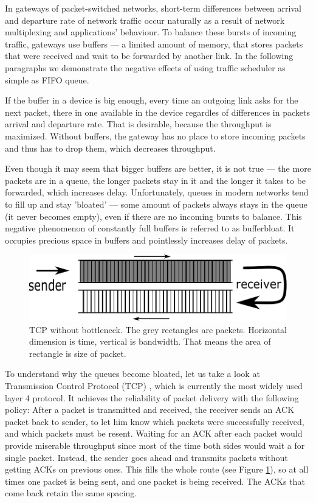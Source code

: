 In gateways of packet-switched networks, short-term differences between arrival and departure rate of network traffic occur naturally as a result of network multiplexing and applications' behaviour. To balance these bursts of incoming traffic, gateways use buffers --- a limited amount of memory, that stores packets that were received and wait to be forwarded by another link. In the following paragraphs we demonstrate the negative effects of using traffic scheduler as simple as FIFO queue.

If the buffer in a device is big enough, every time an outgoing link asks for the next packet, there in one available in the device regardles of differences in packets arrival and departure rate. That is desirable, because the throughput is maximized. Without buffers, the gateway has no place to store incoming packets and thus has to drop them, which decreases throughput.

Even though it may seem that bigger buffers are better, it is not true --- the more packets are in a queue, the longer packets stay in it and the longer it takes to be forwarded, which increases delay. Unfortunately, queues in modern networks tend to fill up and stay 'bloated' \cite{Gettys:2012:BDB:2063176.2063196} --- some amount of packets always stays in the queue (it never becomes empty), even if there are no incoming bursts to balance. This negative phenomenon of constantly full buffers is referred to as bufferbloat. It occupies precious space in buffers and pointlessly increases delay of packets.

\begin{figure}
	\centering
	\includegraphics[width=.8\linewidth]{drawings/tcp_no_bottleneck}
	\caption{TCP without bottleneck. The grey rectangles are packets. Horizontal dimension is time, vertical is bandwidth. That means the area of rectangle is size of packet.}
	\label{fig01:no_bottle}
\end{figure}

To understand why the queues become bloated, let us take a look at Transmission Control Protocol (TCP) \cite{rfc793}, which is currently the most widely used layer 4 protocol. It achieves the reliability of packet delivery with the following policy: After a packet is transmitted and received, the receiver sends an ACK packet back to sender, to let him know which packets were successfully received, and which packets must be resent. Waiting for an ACK after each packet would provide miserable throughput since most of the time both sides would wait a for single packet. Instead, the sender goes ahead and transmits packets without getting ACKs on previous ones. This fills the whole route (see Figure \ref{fig01:no_bottle}), so at all times one packet is being sent, and one packet is being received. The ACKs that come back retain the same spacing.

